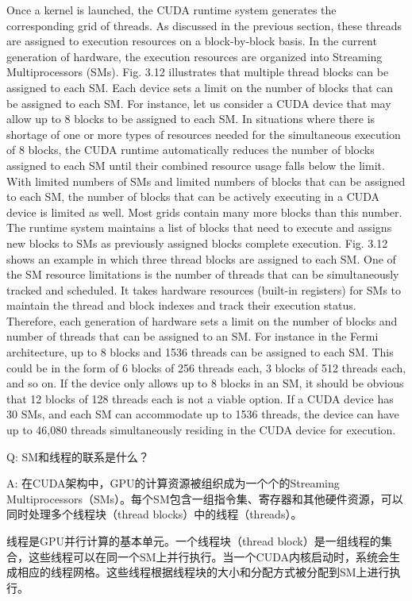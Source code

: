 \documentclass[11pt]{ctexart}
\begin{document}
Once a kernel is launched, the CUDA runtime system generates the corresponding grid of threads. As discussed in the previous section, these threads are assigned to execution resources on a block-by-block basis. In the current generation of hardware, the execution resources are organized into Streaming Multiprocessors (SMs).
Fig. 3.12 illustrates that multiple thread blocks can be assigned to each SM. Each device sets a limit on the number of blocks that can be assigned to each SM. For instance, let us consider a CUDA device that may allow up to 8 blocks to be assigned to each SM. In situations where there is shortage of one or more types of resources needed for the simultaneous execution of 8 blocks, the CUDA runtime automatically reduces the number of blocks assigned to each SM until their combined resource usage falls below the limit. With limited numbers of SMs and limited numbers of blocks that can be assigned to each SM, the number of blocks that can be actively executing in a CUDA device is limited as well. Most grids contain many more blocks than this number. The runtime system maintains a list of blocks that need to execute and assigns new blocks to SMs as previously assigned blocks complete execution.
Fig. 3.12 shows an example in which three thread blocks are assigned to each SM.
One of the SM resource limitations is the number of threads that can be simultaneously tracked and scheduled. It takes hardware resources (built-in registers) for SMs to maintain the thread and block indexes and track their execution status. Therefore,
each generation of hardware sets a limit on the number of blocks and number of threads that can be assigned to an SM. For instance in the Fermi architecture, up to 8 blocks and 1536 threads can be assigned to each SM. This could be in the form of
6 blocks of 256 threads each, 3 blocks of 512 threads each, and so on. If the device only allows up to 8 blocks in an SM, it should be obvious that 12 blocks of 128 threads each is not a viable option. If a CUDA device has 30 SMs, and each SM can accommodate up to 1536 threads, the device can have up to 46,080 threads simultaneously residing in the CUDA device for execution.

Q: 
SM和线程的联系是什么？

A: 
在CUDA架构中，GPU的计算资源被组织成为一个个的Streaming Multiprocessors（SMs）。每个SM包含一组指令集、寄存器和其他硬件资源，可以同时处理多个线程块（thread blocks）中的线程（threads）。

线程是GPU并行计算的基本单元。一个线程块（thread block）是一组线程的集合，这些线程可以在同一个SM上并行执行。当一个CUDA内核启动时，系统会生成相应的线程网格。这些线程根据线程块的大小和分配方式被分配到SM上进行执行。
\end{document}
